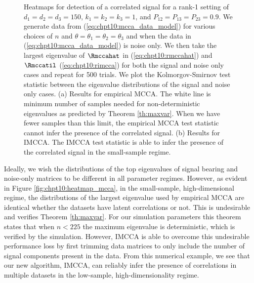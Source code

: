 \begin{figure}
  \begin{center}
    \caption{Heatmaps for detection of a correlated signal for a rank-1 setting of
      $d_1=d_2=d_3=150$, $k_1=k_2=k_3=1$, and $P_{12}=P_{13}=P_{23}=0.9$. We generate data
      from (\ref{eq:chpt10:mcca_data_model}) for various choices of $n$ and
      $\theta=\theta_1=\theta_2=\theta_3$ and when the data in
      (\ref{eq:chpt10:mcca_data_model}) is noise only. We then take the largest eigenvalue
      of $\Rmccahat$ in (\ref{eq:chpt10:rmccahat}) and $\Rmccatil$ (\ref{eq:chpt10:rimcca})
      for both the signal and noise only cases and repeat for 500 trials. We plot the
      Kolmorgov-Smirnov test statistic between the eigenvalue distributions of the signal
      and noise only cases. (a) Results for empirical MCCA. The white line is minimum
      number of samples needed for non-deterministic eigenvalues as predicted by Theorem
      \ref{th:maxvar}. When we have fewer samples than this limit, the empirical MCCA test statistic cannot
      infer the presence of the correlated signal. (b) Results for IMCCA. The IMCCA test statistic is able
      to infer the presence of the correlated signal in the small-sample regime.}
    \label{fig:chpt10:heatmap}
  \end{center}
\end{figure}

Ideally, we wish the distributions of the top eigenvalues of signal bearing and noise-only
matrices to be different in all parameter regimes. However, as evident in Figure
\ref{fig:chpt10:heatmap_mcca}, in the small-sample, high-dimensional regime, the
distributions of the largest eigenvalue used by empirical MCCA are identical whether the
datasets have latent correlations or not. This is undesirable and verifies Theorem
\ref{th:maxvar}. For our simulation parameters this theorem states that when $n<225$ the
maximum eigenvalue is deterministic, which is verified by the simulation. However, IMCCA
is able to overcome this undesirable performance loss by first trimming data matrices to
only include the number of signal components present in the data. From this numerical
example, we see that our new algorithm, IMCCA, can reliably infer the presence of
correlations in multiple datasets in the low-sample, high-dimensionality regime.

